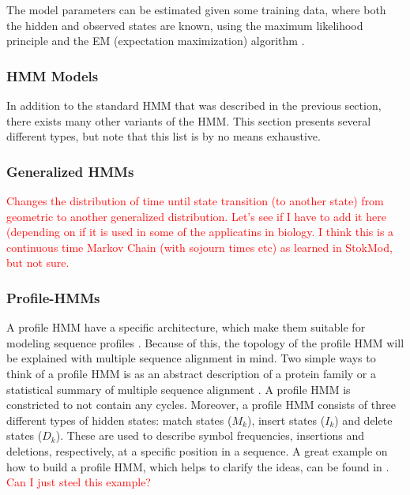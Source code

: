\documentclass{article}
\begin{document}
The model parameters can be estimated given some training data, where both the hidden and observed states are known, using the maximum likelihood principle and the EM (expectation maximization) algorithm \cite{Christianini2006}.

\subsubsection{HMM Models}
In addition to the standard HMM that was described in the previous section, there exists many other variants of the HMM. This section presents several different types, but note that this list is by no means exhaustive. 

\subsubsection{Generalized HMMs}
\textcolor{red}{Changes the distribution of time until state transition (to another state) from geometric to another generalized distribution. Let's see if I have to add it here (depending on if it is used in some of the applicatins in biology. I think this is a continuous time Markov Chain (with sojourn times etc) as learned in StokMod, but not sure. } 

\subsubsection{Profile-HMMs}
A profile HMM have a specific architecture, which make them suitable for modeling sequence profiles \cite{Yoon2009}. Because of this, the topology of the profile HMM will be explained with multiple sequence alignment in mind. Two simple ways to think of a profile HMM is as an abstract description of a protein family or a statistical summary of multiple sequence alignment \cite{Christianini2006}. A profile HMM is constricted to not contain any cycles. Moreover, a profile HMM consists of three different types of hidden states: match states ($M_k$), insert states ($I_k$) and delete states ($D_k$). These are used to describe symbol frequencies, insertions and deletions, respectively, at a specific position in a sequence. A great example on how to build a profile HMM, which helps to clarify the ideas, can be found in \cite{Yoon2009}. \textcolor{red}{Can I just steel this example?}
\end{document}
